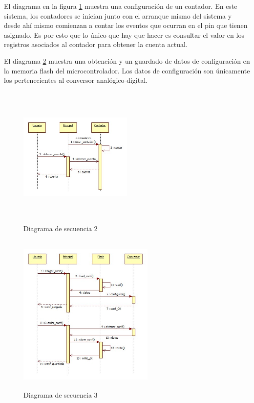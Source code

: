 \documentclass{article}
\theoremstyle{definition}
\theoremstyle{remark}
\begin{document}
El diagrama en la figura \ref{fig:secuencia2} muestra una configuración de un contador. En este sistema, los contadores se inician junto con el arranque mismo del sistema y desde ahí mismo comienzan a contar los eventos que ocurran en el pin que tienen asignado. Es por esto que lo único que hay que hacer es consultar el valor en los registros asociados al contador para obtener la cuenta actual.

El diagrama \ref{fig:secuencia3} muestra una obtención y un guardado de datos de configuración en la memoria flash del microcontrolador. Los datos de configuración son únicamente los pertenecientes al conversor analógico-digital.

\begin{figure}[h]
  \centering
  \includegraphics[width=0.50\textwidth, height = 7cm]{Secuencia2}
  \caption{Diagrama de secuencia 2}\label{fig:secuencia2}
\end{figure}


\begin{figure}[H]
  \centering
  \includegraphics[width=0.60\textwidth, height = 8cm]{Secuencia3}
  \caption{Diagrama de secuencia 3}\label{fig:secuencia3}
\end{figure}
\end{document}
